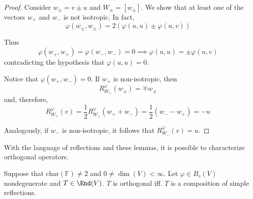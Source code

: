 \begin{proof}
  Consider $w_\pm = v \pm u$ and $W_\pm = [w_\pm]$. We show that at least one of the vectors $w_+$ and $w_-$ is not isotropic. In fact,
  \[
    \varphi(w_\pm, w_\pm) = 2(\varphi(u,u) \pm \varphi(u,v))
  \]

  Thus
  \[
    \varphi(w_+, w_+) = \varphi(w_-, w_-) = 0 \implies \varphi(u,u) = \pm \varphi(u,v)
  \]
  contradicting the hypothesis that $\varphi(u,u) = 0$. 

  Notice that $\varphi(w_+, w_-) = 0$. If $w_+$ is non-isotropic, then
  \[
    R_{W_+}^\varphi(w_\pm) = \mp w_\pm
  \]
  and, therefore, 
  \[
    R_{W_+}^\varphi(v) = \frac{1}{2} R_{W_+}^\varphi(w_+ + w_-) = \frac{1}{2} (w_- - w_+) = - u
  \]

  Analogously, if $w_-$ is non-isotropic, it follows that $R_{W_-}^\varphi(v) = u$.
\end{proof}

With the language of reflections and these lemmas, it is possible to characterize orthogonal operators.

\begin{theorem}\label{thm:202301041019}
  Suppose that $\text{char}(\mathbb{F}) \neq 2$ and $0 \neq \dim(V) < \infty$. Let $\varphi \in B_s(V)$ nondegenerate and $T \in \End(V)$. $T$ is orthogonal iff. $T$ is a composition of simple reflections.
\end{theorem}

